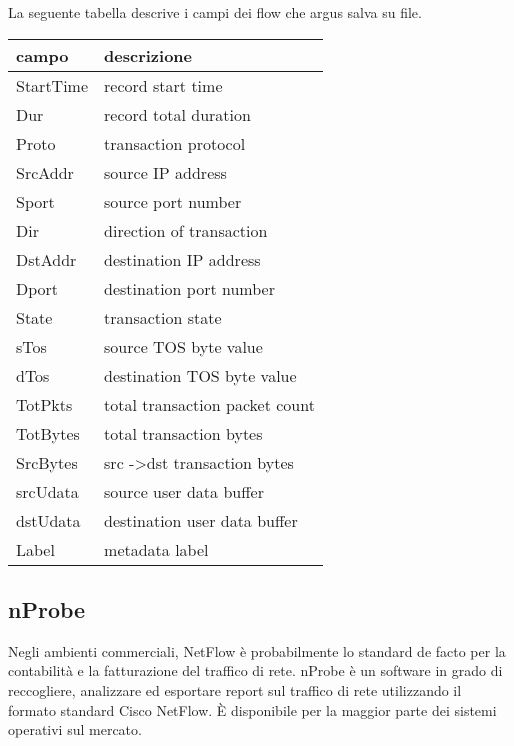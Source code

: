 \documentclass[../main.tex]{subfiles}
\begin{document}
La seguente tabella descrive i campi dei flow che argus salva su file.


\begin{table}[h]
\begin{tabular}{|l|l|}
\hline
\textbf{campo} & \textbf{descrizione}                    \\ \hline
StartTime      & record start time                       \\ \hline
Dur            & record total duration                   \\ \hline
Proto          & transaction protocol                    \\ \hline
SrcAddr        & source IP address                       \\ \hline
Sport          & source port number                      \\ \hline
Dir            & direction of transaction                \\ \hline
DstAddr        & destination IP address                  \\ \hline
Dport          & destination port number                 \\ \hline
State          & transaction state                       \\ \hline
sTos           & source TOS byte value                   \\ \hline
dTos           & destination TOS byte value              \\ \hline
TotPkts        & total transaction packet count          \\ \hline
TotBytes       & total transaction bytes                 \\ \hline
SrcBytes       & src -\textgreater dst transaction bytes \\ \hline
srcUdata       & source user data buffer                 \\ \hline
dstUdata       & destination user data buffer            \\ \hline
Label          & metadata label                          \\ \hline
\end{tabular}
\end{table}

\subsection{nProbe}

Negli ambienti commerciali, NetFlow è probabilmente lo standard de facto per la contabilità e la fatturazione del traffico di rete. nProbe è un software in grado di reccogliere, analizzare ed esportare report sul traffico di rete utilizzando il formato standard Cisco NetFlow. È disponibile per la maggior parte dei sistemi operativi sul mercato. \newline
\end{document}
